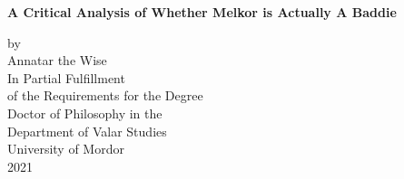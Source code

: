 
\newcommand{\thesisTitle}{A Critical Analysis of Whether Melkor is Actually A Baddie}
\newcommand{\yourName}{Annatar the Wise}
\newcommand{\yourSchool}{University of Mordor}
\newcommand{\yourMonth}{}
\newcommand{\yourYear}{2021}

\begin{titlepage}
\begin{center}

\begin{singlespacing}

\textbf{\thesisTitle}\\
\vspace{10\baselineskip}

by\\
\vspace{3\baselineskip}
Annatar the Wise\\
\vspace{3\baselineskip}
In Partial Fulfillment\\
of the Requirements for the Degree\\
Doctor of Philosophy in the\\
Department of Valar Studies \\
\vspace{3\baselineskip}
 University of Mordor\\
\vspace{\baselineskip}
\yourMonth{} \yourYear{}
\vfill


\end{singlespacing}

\end{center}
\end{titlepage}
